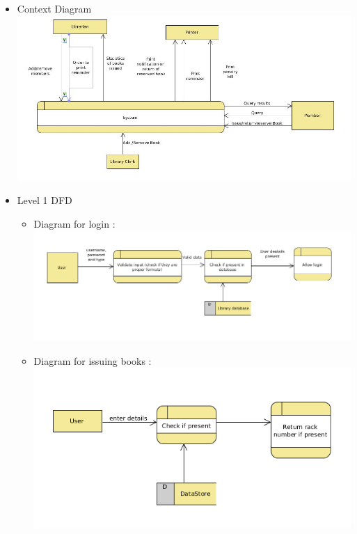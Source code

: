 \documentclass[a4paper]{article}
\begin{document}
\begin{itemize}
\item Context Diagram\\
\includegraphics[scale=0.5]{images/contextDiag.jpg}
\item Level 1 DFD\\
\begin{itemize}
\item Diagram for login : \\
\includegraphics[scale=0.5]{images/dfdDiagLogin.png}\\
\item Diagram for issuing books : \\ \includegraphics[scale=0.5]{images/DFDDiagIssue.png}\\

\end{itemize}
\end{itemize}
\end{document}
